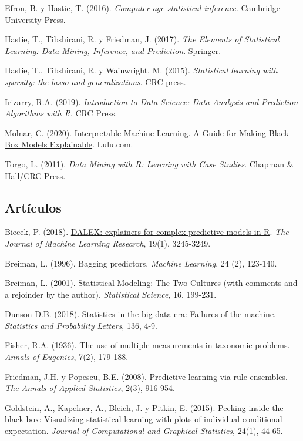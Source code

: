 \documentclass[]{book}
\theoremstyle{break}
\theoremstyle{definition}
\theoremstyle{definition}
\theoremstyle{definition}
\theoremstyle{remark}
\begin{document}
Efron, B. y Hastie, T. (2016).
\emph{\href{http://web.stanford.edu/~hastie/CASI/}{Computer age
statistical inference}}. Cambridge University Press.

Hastie, T., Tibshirani, R. y Friedman, J. (2017).
\emph{\href{https://web.stanford.edu/~hastie/ElemStatLearn}{The Elements
of Statistical Learning: Data Mining, Inference, and Prediction}}.
Springer.

Hastie, T., Tibshirani, R. y Wainwright, M. (2015). \emph{Statistical
learning with sparsity: the lasso and generalizations}. CRC press.

Irizarry, R.A. (2019).
\emph{\href{https://rafalab.github.io/dsbook}{Introduction to Data
Science: Data Analysis and Prediction Algorithms with R}}. CRC Press.

Molnar, C. (2020).
\href{https://christophm.github.io/interpretable-ml-book}{Interpretable
Machine Learning. A Guide for Making Black Box Models Explainable}.
Lulu.com.

Torgo, L. (2011). \emph{Data Mining with R: Learning with Case Studies}.
Chapman \& Hall/CRC Press.

\subsection*{Artículos}\label{artuxedculos}

Biecek, P. (2018).
\href{http://www.jmlr.org/papers/volume19/18-416/18-416.pdf}{DALEX:
explainers for complex predictive models in R}. \emph{The Journal of
Machine Learning Research}, 19(1), 3245-3249.

Breiman, L. (1996). Bagging predictors. \emph{Machine Learning}, 24 (2),
123-140.

Breiman, L. (2001). Statistical Modeling: The Two Cultures (with
comments and a rejoinder by the author). \emph{Statistical Science}, 16,
199-231.

Dunson D.B. (2018). Statistics in the big data era: Failures of the
machine. \emph{Statistics and Probability Letters}, 136, 4-9.

Fisher, R.A. (1936). The use of multiple measurements in taxonomic
problems. \emph{Annals of Eugenics}, 7(2), 179-188.

Friedman, J.H. y Popescu, B.E. (2008). Predictive learning via rule
ensembles. \emph{The Annals of Applied Statistics}, 2(3), 916-954.

Goldstein, A., Kapelner, A., Bleich, J. y Pitkin, E. (2015).
\href{https://doi.org/10.1080/10618600.2014.907095}{Peeking inside the
black box: Visualizing statistical learning with plots of individual
conditional expectation}. \emph{Journal of Computational and Graphical
Statistics}, 24(1), 44-65.
\end{document}
